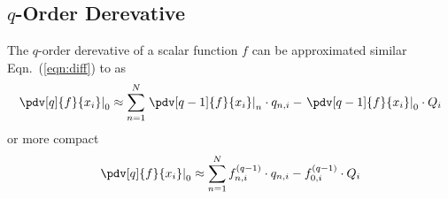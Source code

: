 \subsection{$q$-Order Derevative}
The $q$-order derevative of a scalar function $f$ can be approximated similar Eqn.~(\ref{eqn:diff}) to as
\begin{equation}
	\left.\pdv[q]{f}{x_i}\right|_0 \approx \sum_{n = 1}^N \left.\pdv[q-1]{f}{x_i} \right|_n \cdot q_{n, i} - \left.\pdv[q-1]{f}{x_i} \right|_0  \cdot Q_i
\end{equation}
or more compact
\begin{equation}
	\left.\pdv[q]{f}{x_i}\right|_0 \approx \sum_{n = 1}^N f^{(q-1)}_{n, i} \cdot q_{n, i} - f^{(q-1)}_{0, i}  \cdot Q_i
\end{equation}

